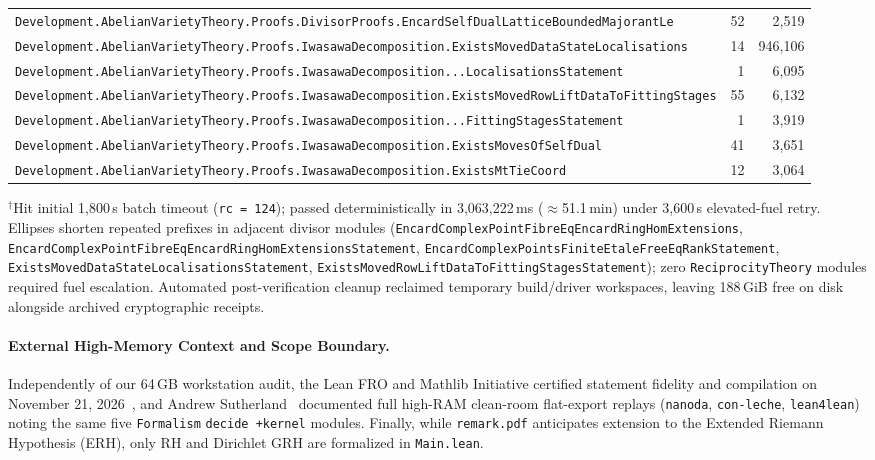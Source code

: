 \documentclass[11pt,a4paper]{article}
\begin{document}
\begin{table}[!htb]
{\begin{tabular}{@{}lrr@{}}
\texttt{Development.AbelianVarietyTheory.Proofs.DivisorProofs.EncardSelfDualLatticeBoundedMajorantLe} & 52 & 2,519 \\
\texttt{Development.AbelianVarietyTheory.Proofs.IwasawaDecomposition.ExistsMovedDataStateLocalisations} & 14 & 946,106 \\
\texttt{Development.AbelianVarietyTheory.Proofs.IwasawaDecomposition...LocalisationsStatement} & 1 & 6,095 \\
\texttt{Development.AbelianVarietyTheory.Proofs.IwasawaDecomposition.ExistsMovedRowLiftDataToFittingStages} & 55 & 6,132 \\
\texttt{Development.AbelianVarietyTheory.Proofs.IwasawaDecomposition...FittingStagesStatement} & 1 & 3,919 \\
\texttt{Development.AbelianVarietyTheory.Proofs.IwasawaDecomposition.ExistsMovesOfSelfDual} & 41 & 3,651 \\
\texttt{Development.AbelianVarietyTheory.Proofs.IwasawaDecomposition.ExistsMtTieCoord} & 12 & 3,064 \\
\bottomrule
\end{tabular}
}

\vspace{2pt}
\raggedright\scriptsize $^\dagger$Hit initial 1,800\,s batch timeout (\texttt{rc = 124}); passed deterministically in 3,063,222\,ms ($\approx$51.1\,min) under 3,600\,s elevated-fuel retry. Ellipses shorten repeated prefixes in adjacent divisor modules (\texttt{EncardComplexPointFibreEqEncardRingHomExtensions}, \texttt{EncardComplexPointFibreEqEncardRingHomExtensionsStatement}, \texttt{EncardComplexPointsFiniteEtaleFreeEqRankStatement}, \texttt{ExistsMovedDataStateLocalisationsStatement}, \texttt{ExistsMovedRowLiftDataToFittingStagesStatement}); zero \texttt{ReciprocityTheory} modules required fuel escalation. Automated post-verification cleanup reclaimed temporary build/driver workspaces, leaving 188\,GiB free on disk alongside archived cryptographic receipts.
\end{table}

\paragraph{External High-Memory Context and Scope Boundary.} Independently of our 64\,GB workstation audit, the Lean FRO and Mathlib Initiative certified statement fidelity and compilation on November 21, 2026~\cite{leanfro2026}, and Andrew Sutherland~\cite{sutherland2026} documented full high-RAM clean-room flat-export replays (\texttt{nanoda}, \texttt{con-leche}, \texttt{lean4lean}) noting the same five \texttt{Formalism} \texttt{decide +kernel} modules. Finally, while \texttt{remark.pdf} anticipates extension to the Extended Riemann Hypothesis (ERH), only RH and Dirichlet GRH are formalized in \texttt{Main.lean}.
\end{document}
